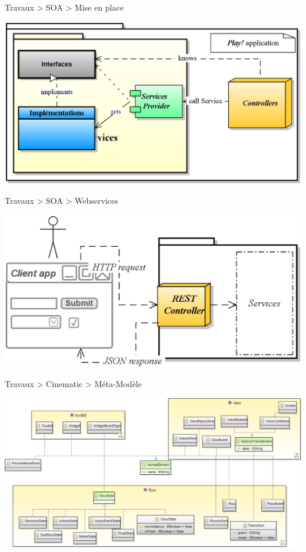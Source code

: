\documentclass[HeilHazel,pdf,final,colorBG,slideColor]{prosper}
\begin{document}
\begin{slide}{Travaux > SOA > Mise en place}

  \bc{} 
    \includegraphics[scale=.3]{img/SOA_impl.eps} 
  \ec{}

\end{slide}

\begin{slide}{Travaux > SOA > Webservices}

  \bc{} 
    \includegraphics[scale=.4]{img/SOA_WS.eps} 
  \ec{}

\end{slide}

\begin{slide}{Travaux > Cinematic > Méta-Modèle}

  \bc{}
    \includegraphics[scale=.24]{img/cinematic_m2.eps} 
  \ec{}

\end{slide}
\end{document}
